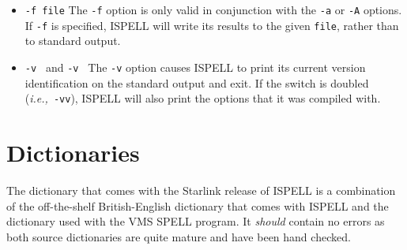 \begin{itemize}
To summarize these:

\begin{itemize}

   \item \verb+*+ Add to personal dictionary.
   \item \verb+@+ Accept word, but leave out of dictionary.
   \item \verb+#+ Save current personal dictionary.
   \item \verb+~+ Set parameters based on filename.
   \item \verb=+= Enter \TeX\ mode.
   \item \verb+-+ Exit \TeX\ mode.
   \item \verb+!+ Enter terse mode.
   \item \verb+%+ Exit terse mode.
   \item \verb+^+ Spell-check rest of line.

\end{itemize}

In terse mode, ISPELL will not print lines beginning with \verb-*+-, or
\verb+-+, all of which indicate correct words.
This significantly improves running speed when the driving program is going to
ignore correct words anyway.

\item {\Large\tt -f file} \sunspec{\\}{}
The \verb+-f+ option is only valid in conjunction with the \verb+-a+ or
\verb+-A+ options.
If \verb+-f+ is specified, ISPELL will write its results to the given
\verb+file+, rather than to standard output.

\item {\Large\tt -v } and {\Large\tt -v } \sunspec{\\}{}
The \verb+-v+ option causes ISPELL to print its current version identification
on the standard output and exit.
If the switch is doubled ({\it{i.e.,}}\ \verb+-vv+), ISPELL will also print the
options that it was compiled with.

\end{itemize}

\section{Dictionaries}

The dictionary that comes with the Starlink release of ISPELL is a combination
of the off-the-shelf British-English dictionary that comes with ISPELL and the
dictionary used with the VMS SPELL program.  It {\em should} contain no errors
as both source dictionaries are quite mature and have been hand checked.

